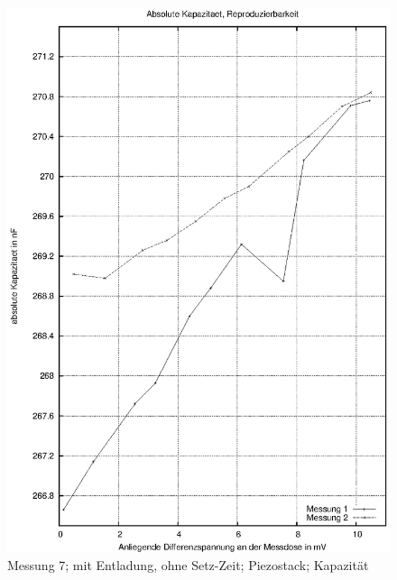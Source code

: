\documentclass[11pt]{scrreprt} %
\begin{document}
\begin {figure}[htbp]
      \begin{center}
        \includegraphics{tabelle2_2_2}
      \end{center}
\caption{Messung 7; mit Entladung, ohne Setz-Zeit; Piezostack; Kapazität}
\label{fig:2.7}
\end{figure}
\end{document}
